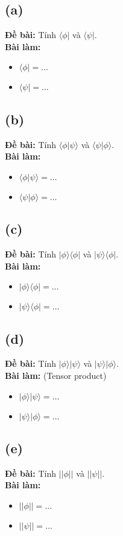 \subsection{(a)}
\textbf{Đề bài:} Tính $\langle\phi|$ và $\langle\psi|$.\\
\textbf{Bài làm:}
\begin{itemize}
    \item $\langle\phi| = \dots$
    \item $\langle\psi| = \dots$
\end{itemize}

\subsection{(b)}
\textbf{Đề bài:} Tính $\langle\phi|\psi\rangle$ và $\langle\psi|\phi\rangle$.\\
\textbf{Bài làm:}
\begin{itemize}
    \item $\langle\phi|\psi\rangle = \dots$
    \item $\langle\psi|\phi\rangle = \dots$
\end{itemize}

\subsection{(c)}
\textbf{Đề bài:} Tính $|\phi\rangle\langle\phi|$ và $|\psi\rangle\langle\phi|$.\\
\textbf{Bài làm:}
\begin{itemize}
    \item $|\phi\rangle\langle\phi| = \dots$
    \item $|\psi\rangle\langle\phi| = \dots$
\end{itemize}

\subsection{(d)}
\textbf{Đề bài:} Tính $|\phi\rangle|\psi\rangle$ và $|\psi\rangle|\phi\rangle$.\\
\textbf{Bài làm:} (Tensor product)
\begin{itemize}
    \item $|\phi\rangle|\psi\rangle = \dots$
    \item $|\psi\rangle|\phi\rangle = \dots$
\end{itemize}

\subsection{(e)}
\textbf{Đề bài:} Tính $||\phi||$ và $||\psi||$.\\
\textbf{Bài làm:}
\begin{itemize}
    \item $||\phi|| = \dots$
    \item $||\psi|| = \dots$
\end{itemize}

